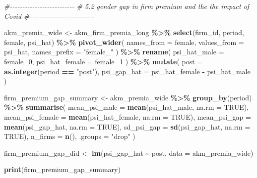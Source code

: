 \documentclass[
]{article}
\newenvironment{Shaded}{\begin{snugshade}}{\end{snugshade}}
\newcommand{\AttributeTok}[1]{\textcolor[rgb]{0.13,0.29,0.53}{#1}}
\newcommand{\CommentTok}[1]{\textcolor[rgb]{0.56,0.35,0.01}{\textit{#1}}}
\newcommand{\ConstantTok}[1]{\textcolor[rgb]{0.56,0.35,0.01}{#1}}
\newcommand{\FunctionTok}[1]{\textcolor[rgb]{0.13,0.29,0.53}{\textbf{#1}}}
\newcommand{\NormalTok}[1]{#1}
\newcommand{\OtherTok}[1]{\textcolor[rgb]{0.56,0.35,0.01}{#1}}
\newcommand{\SpecialCharTok}[1]{\textcolor[rgb]{0.81,0.36,0.00}{\textbf{#1}}}
\newcommand{\StringTok}[1]{\textcolor[rgb]{0.31,0.60,0.02}{#1}}
\begin{document}
\begin{Shaded}
\begin{Highlighting}[]
\CommentTok{\#{-}{-}{-}{-}{-}{-}{-}{-}{-}{-}{-}{-}{-}{-}{-}{-}{-}{-}{-}{-}{-}{-}{-}{-}{-}{-}}
\CommentTok{\# 5.2 gender gap in firm premium and the the impact of Covid}
\CommentTok{\#{-}{-}{-}{-}{-}{-}{-}{-}{-}{-}{-}{-}{-}{-}{-}{-}{-}{-}{-}{-}{-}{-}{-}{-}{-}{-}}

\NormalTok{akm\_premia\_wide }\OtherTok{\textless{}{-}}\NormalTok{ akm\_firm\_premia\_long }\SpecialCharTok{\%\textgreater{}\%}
    \FunctionTok{select}\NormalTok{(firm\_id, period, female, psi\_hat) }\SpecialCharTok{\%\textgreater{}\%}
    \FunctionTok{pivot\_wider}\NormalTok{(}
        \AttributeTok{names\_from =}\NormalTok{ female,}
        \AttributeTok{values\_from =}\NormalTok{ psi\_hat,}
        \AttributeTok{names\_prefix =} \StringTok{"female\_"}
\NormalTok{    ) }\SpecialCharTok{\%\textgreater{}\%}
    \FunctionTok{rename}\NormalTok{(}
        \AttributeTok{psi\_hat\_male =}\NormalTok{ female\_0,}
        \AttributeTok{psi\_hat\_female =}\NormalTok{ female\_1}
\NormalTok{    ) }\SpecialCharTok{\%\textgreater{}\%}
    \FunctionTok{mutate}\NormalTok{(}
        \AttributeTok{post =} \FunctionTok{as.integer}\NormalTok{(period }\SpecialCharTok{==} \StringTok{"post"}\NormalTok{),}
        \AttributeTok{psi\_gap\_hat =}\NormalTok{ psi\_hat\_female }\SpecialCharTok{{-}}\NormalTok{ psi\_hat\_male}
\NormalTok{    )}

\NormalTok{firm\_premium\_gap\_summary }\OtherTok{\textless{}{-}}\NormalTok{ akm\_premia\_wide }\SpecialCharTok{\%\textgreater{}\%}
    \FunctionTok{group\_by}\NormalTok{(period) }\SpecialCharTok{\%\textgreater{}\%}
    \FunctionTok{summarise}\NormalTok{(}
        \AttributeTok{mean\_psi\_male =} \FunctionTok{mean}\NormalTok{(psi\_hat\_male, }\AttributeTok{na.rm =} \ConstantTok{TRUE}\NormalTok{),}
        \AttributeTok{mean\_psi\_female =} \FunctionTok{mean}\NormalTok{(psi\_hat\_female, }\AttributeTok{na.rm =} \ConstantTok{TRUE}\NormalTok{),}
        \AttributeTok{mean\_psi\_gap =} \FunctionTok{mean}\NormalTok{(psi\_gap\_hat, }\AttributeTok{na.rm =} \ConstantTok{TRUE}\NormalTok{),}
        \AttributeTok{sd\_psi\_gap =} \FunctionTok{sd}\NormalTok{(psi\_gap\_hat, }\AttributeTok{na.rm =} \ConstantTok{TRUE}\NormalTok{),}
        \AttributeTok{n\_firms =} \FunctionTok{n}\NormalTok{(),}
        \AttributeTok{.groups =} \StringTok{"drop"}
\NormalTok{    )}

\NormalTok{firm\_premium\_gap\_did }\OtherTok{\textless{}{-}} \FunctionTok{lm}\NormalTok{(psi\_gap\_hat }\SpecialCharTok{\textasciitilde{}}\NormalTok{ post, }\AttributeTok{data =}\NormalTok{ akm\_premia\_wide)}

\FunctionTok{print}\NormalTok{(firm\_premium\_gap\_summary)}
\end{Highlighting}
\end{Shaded}
\end{document}

